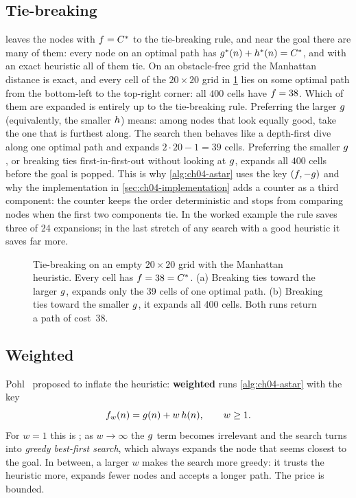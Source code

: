 \subsection{Tie-breaking}
\label{sec:ch04-tiebreak}

 leaves the nodes with $f = C^*$ to the tie-breaking
rule, and near the goal there are many of them: every node on an optimal path
has $g^*(n) + h^*(n) = C^*$, and with an exact heuristic all of them
tie. On an obstacle-free grid the Manhattan distance is exact, and every cell
of the $20 \times 20$ grid in \cref{fig:ch04-tiebreak} lies on some optimal
path from the bottom-left to the top-right corner: all $400$ cells have
$f = 38$. Which of them are expanded is entirely up to the tie-breaking
rule. Preferring the larger $g$ (equivalently, the smaller $h$)
means: among nodes that look equally good, take the one that is furthest along.
The search then behaves like a depth-first dive along one optimal path and
expands $2 \cdot 20 - 1 = 39$ cells. Preferring the smaller $g$, or
breaking ties first-in-first-out without looking at $g$, expands all $400$
cells before the goal is popped. This is why \cref{alg:ch04-astar} uses the key
$(f, -g)$ and why the implementation in
\cref{sec:ch04-implementation} adds a counter as a third component: the counter
keeps the order deterministic and stops \python from comparing nodes when the
first two components tie. In the worked example the rule saves three of 24
expansions; in the last stretch of any search with a good heuristic it saves
far more.

\begin{figure}[tb]
  \centering
  \caption{Tie-breaking on an empty $20 \times 20$ grid with the Manhattan
  heuristic. Every cell has $f = 38 = C^*$. (a) Breaking ties toward the
  larger $g$, \astar expands only the 39 cells of one optimal path.
  (b) Breaking ties toward the smaller $g$, it expands all 400 cells.
  Both runs return a path of cost~38.}
  \label{fig:ch04-tiebreak}
\end{figure}

\subsection{Weighted \astar}
\label{sec:ch04-weighted}

Pohl~\cite{pohl1970heuristic} proposed to inflate the heuristic:
\textbf{weighted \astar} runs
\cref{alg:ch04-astar} with the key
\begin{equation}
  f_w(n) = g(n) + w\,h(n), \qquad w \ge 1.
  \label{eq:ch04-weighted}
\end{equation}
For $w = 1$ this is \astar; as $w \to \infty$ the $g$ term becomes
irrelevant and the search turns into \emph{greedy best-first search}, which
always expands the node that seems closest to the goal. In between, a larger
$w$ makes the search more greedy: it trusts the heuristic more, expands fewer
nodes and accepts a longer path. The price is bounded.

